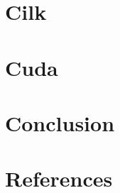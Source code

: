 \documentclass{article}
\begin{document}
\section{Cilk}


\section{Cuda}



\section{Conclusion}


\section{References}

\end{document}
